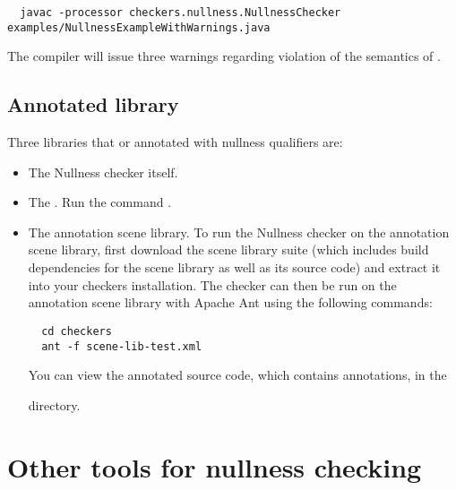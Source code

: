 \begin{Verbatim}
  javac -processor checkers.nullness.NullnessChecker examples/NullnessExampleWithWarnings.java
\end{Verbatim}

\noindent
The compiler will issue three warnings regarding violation of the semantics of
.


\subsection{Annotated library\label{nullness-annotated-library}}

Three libraries that or annotated with nullness qualifiers are:

\begin{itemize}
\item
The Nullness checker itself.

\item
The 
.
Run the command .

\item
The annotation scene library.
To run the Nullness checker on the annotation scene library,
first download the scene library suite (which includes build
dependencies for the scene library as well as its source code) and extract it
into your checkers installation. The checker can then be run on the annotation
scene library with Apache Ant using the following commands:

\begin{Verbatim}
  cd checkers
  ant -f scene-lib-test.xml
\end{Verbatim}


You can view the annotated source code, which contains  annotations, in
the
\begin{smaller}
\end{smaller}
directory.

\end{itemize}


\section{Other tools for nullness checking\label{nullness-related-work}}

